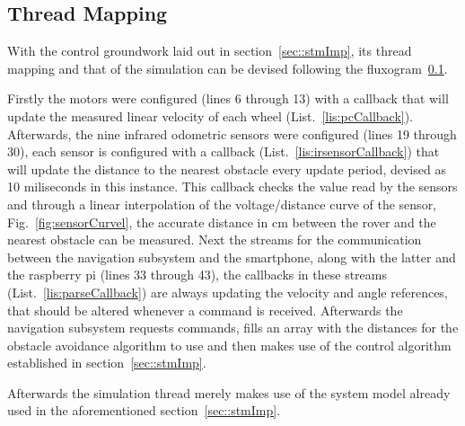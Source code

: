 \subsection{Thread Mapping}
With the control groundwork laid out in section~\ref{sec::stmImp}, its thread mapping and that of the simulation can be devised following the fluxogram~\ref{}.
 
Firstly the motors were configured (lines 6 through 13) with a callback that will update the measured linear velocity of each wheel (List.~\ref{lis:pcCallback}). Afterwards, the nine infrared odometric sensors were configured (lines 19 through 30), each sensor is configured with a callback (List.~\ref{lis:irsensorCallback}) that will update the distance to the nearest obstacle every update period, devised as 10 miliseconds in this instance. This callback checks the value read by the sensors and through a linear interpolation of the voltage/distance curve of the sensor, Fig.~\ref{fig:sensorCurvel}, the accurate distance in cm between the rover and the nearest obstacle can be measured. Next the streams for the communication between the navigation subsystem and the smartphone, along with the latter and the raspberry pi (lines 33 through 43), the callbacks in these streams (List.~\ref{lis:parseCallback}) are always updating the velocity and angle references, that should be altered whenever a command is received. Afterwards the navigation subsystem requests commands, fills an array with the distances for the obstacle avoidance algorithm to use and then makes use of the control algorithm established in section~\ref{sec::stmImp}.
 
 
 

Afterwards the simulation thread merely makes use of the system model already used in the aforementioned section~\ref{sec::stmImp}.
 

